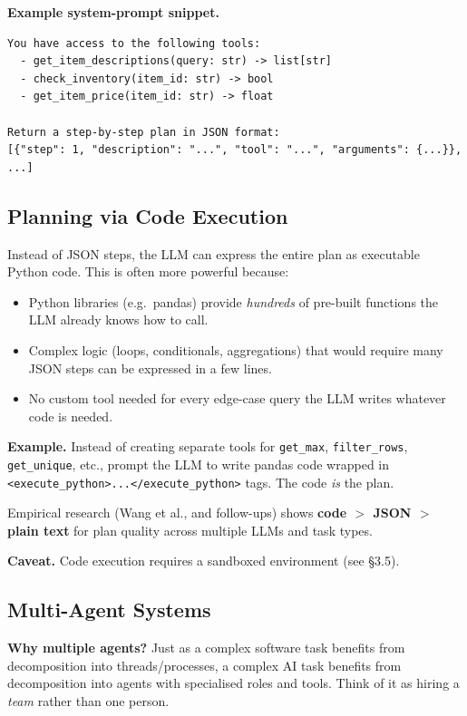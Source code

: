 \documentclass[a4paper,11pt]{article}
\begin{document}
\textbf{Example system-prompt snippet.}
\begin{lstlisting}[language={}]
You have access to the following tools:
  - get_item_descriptions(query: str) -> list[str]
  - check_inventory(item_id: str) -> bool
  - get_item_price(item_id: str) -> float

Return a step-by-step plan in JSON format:
[{"step": 1, "description": "...", "tool": "...", "arguments": {...}}, ...]
\end{lstlisting}

\subsection{Planning via Code Execution}

Instead of JSON steps, the LLM can express the entire plan as
executable Python code. This is often more powerful because:

\begin{itemize}[noitemsep, leftmargin=1.2em]
  \item Python libraries (e.g.\ pandas) provide \textit{hundreds} of
        pre-built functions the LLM already knows how to call.
  \item Complex logic (loops, conditionals, aggregations) that would
        require many JSON steps can be expressed in a few lines.
  \item No custom tool needed for every edge-case query
        \textemdash{} the LLM writes whatever code is needed.
\end{itemize}

\textbf{Example.} Instead of creating separate tools for
\texttt{get\_max}, \texttt{filter\_rows}, \texttt{get\_unique}, etc.,
prompt the LLM to write pandas code wrapped in
\texttt{<execute\_python>...</execute\_python>} tags. The code
\textit{is} the plan.

Empirical research (Wang et al., and follow-ups) shows
\textbf{code $>$ JSON $>$ plain text} for plan quality across
multiple LLMs and task types.

\textbf{Caveat.} Code execution requires a sandboxed environment
(see §3.5).

\subsection{Multi-Agent Systems}

\textbf{Why multiple agents?}
Just as a complex software task benefits from decomposition into
threads/processes, a complex AI task benefits from decomposition
into agents with specialised roles and tools. Think of it as hiring
a \textit{team} rather than one person.
\end{document}
